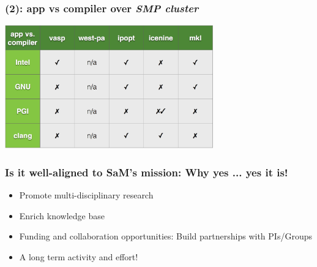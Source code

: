 \documentclass[hyperref={pdfpagelabels=false},12pt]{beamer}
\begin{document}
\begin{frame}
\frametitle{(2): app vs compiler over \textit{SMP cluster}}
\includegraphics[width=9cm]{table}
\end{frame}

\begin{frame}
\frametitle{Is it well-aligned to SaM's mission: Why yes ... yes it is!}
\begin{itemize}
\itemsep1em
\item 
Promote multi-disciplinary research
\item
Enrich knowledge base
\item
Funding and collaboration opportunities: Build partnerships with PIs/Groups
\item
A long term activity and effort!
\end{itemize}
\end{frame}

\end{document}
